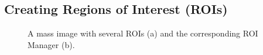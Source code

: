 \documentclass{article}
\begin{document}
\subsection*{Creating Regions of Interest (ROIs)}

	\begin{figure}[p]
	\centering
	\hfill
	\caption{A mass image with several ROIs (a) and the corresponding ROI Manager (b). }
	\end{figure}
\end{document}
